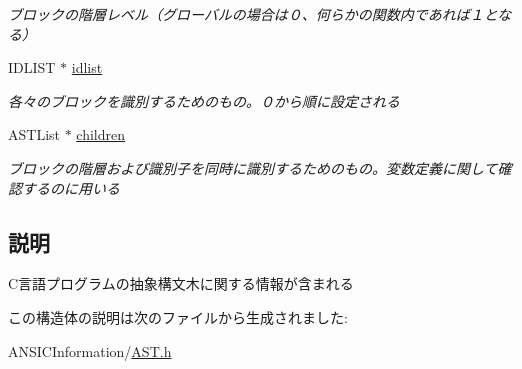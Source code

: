 \begin{DoxyCompactItemize}
\begin{DoxyCompactList}\small\item\em ブロックの階層レベル（グローバルの場合は０、何らかの関数内であれば１となる） \item\end{DoxyCompactList}\item 
IDLIST $\ast$ \hyperlink{structabstract__syntax__tree_a9207cfa97354e44aae39c4686a924357}{idlist}\label{structabstract__syntax__tree_a9207cfa97354e44aae39c4686a924357}

\begin{DoxyCompactList}\small\item\em 各々のブロックを識別するためのもの。０から順に設定される \item\end{DoxyCompactList}\item 
ASTList $\ast$ \hyperlink{structabstract__syntax__tree_ab5e78b5322a2bab5b0aa21d40522a78b}{children}\label{structabstract__syntax__tree_ab5e78b5322a2bab5b0aa21d40522a78b}

\begin{DoxyCompactList}\small\item\em ブロックの階層および識別子を同時に識別するためのもの。変数定義に関して確認するのに用いる \item\end{DoxyCompactList}\end{DoxyCompactItemize}


\subsection{説明}
C言語プログラムの抽象構文木に関する情報が含まれる 

この構造体の説明は次のファイルから生成されました:\begin{DoxyCompactItemize}
\item 
ANSICInformation/\hyperlink{AST_8h}{AST.h}\end{DoxyCompactItemize}
